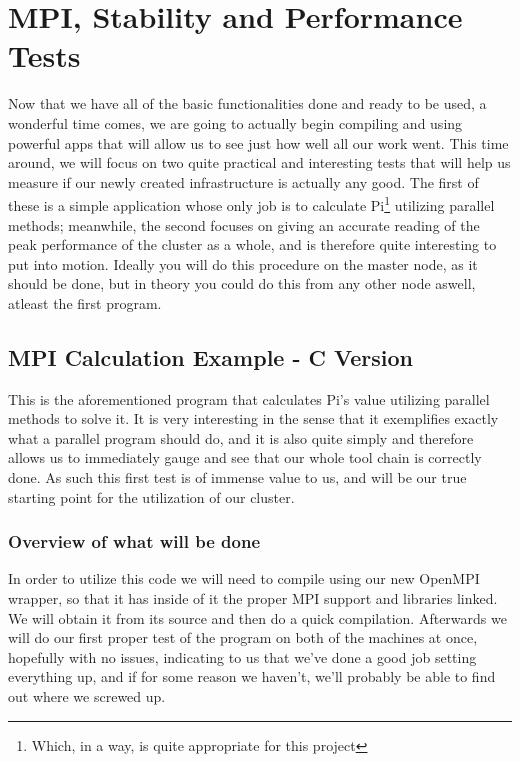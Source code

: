 \documentclass[]{article}
\begin{document}
                                          \section{MPI, Stability and Performance Tests}
                                          Now that we have all of the basic functionalities done and ready to be used, a wonderful time comes, we are going to actually begin
                                          compiling and using powerful apps that will allow us to see just how well all our work went. This time around, we will focus on two 
                                          quite practical and interesting tests that will help us measure if our newly created infrastructure is actually any good. The first of
                                          these is a simple application whose only job is to calculate Pi\footnote{Which, in a way, is quite appropriate for this project} 
                                          utilizing parallel methods; meanwhile, the second focuses on giving an accurate reading of the peak performance of the cluster as a 
                                          whole, and is therefore quite interesting to put into motion. Ideally you will do this procedure on the master node, as it should be 
                                          done, but in theory you could do this from any other node aswell, atleast the first program.

                                          \subsection{MPI Calculation Example - C Version}
                                          This is the aforementioned program that calculates Pi's value utilizing parallel methods to solve it. It is very interesting in the 
                                          sense that it exemplifies exactly what a parallel program should do, and it is also quite simply and therefore allows us to immediately 
                                          gauge and see that our whole tool chain is correctly done. As such this first test is of immense value to us, and will be our true 
                                          starting point for the utilization of our cluster.

                                          \subsubsection{Overview of what will be done}
                                          In order to utilize this code we will need to compile using our new OpenMPI wrapper, so that it has inside of it the proper MPI support
                                          and libraries linked. We will obtain it from its source and then do a quick compilation. Afterwards we will do our first proper test of
                                          the program on both of the machines at once, hopefully with no issues, indicating to us that we've done a good job setting everything 
                                          up, and if for some reason we haven't, we'll probably be able to find out where we screwed up.
\end{document}

